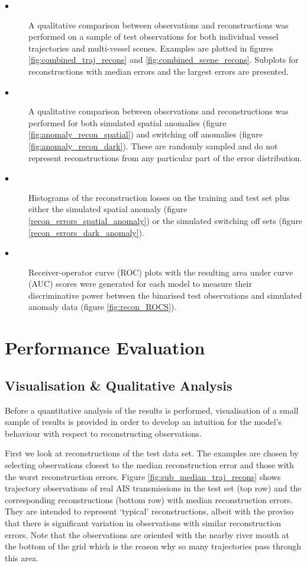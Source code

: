 \documentclass{mldsmsc}
\begin{document}
\begin{description}
	\item [$\bullet$]  A qualitative comparison between observations and reconstructions was performed on a sample of test observations for both individual vessel trajectories and multi-vessel scenes. Examples are plotted in figures \ref{fig:combined_traj_recons} and \ref{fig:combined_scene_recons}. Subplots for reconstructions with median errors and the largest errors are presented. 
	\item [$\bullet$]  A qualitative comparison between observations and reconstructions was performed for both simulated spatial anomalies (figure \ref{fig:anomaly_recon_spatial}) and switching off anomalies (figure \ref{fig:anomaly_recon_dark}). These are randomly sampled and do not represent reconstructions from any particular part of the error distribution.
	\item [$\bullet$] Histograms of the reconstruction losses on the training and test set plus either the simulated spatial anomaly (figure \ref{recon_errors_spatial_anomaly})  or the simulated switching off sets (figure \ref{recon_errors_dark_anomaly}). 
	\item [$\bullet$] Receiver-operator curve (ROC) plots with the resulting area under curve (AUC) scores were generated for each model to measure their discriminative power between the binarised test observations and simulated anomaly data (figure \ref{fig:recon_ROCS}). 
\end{description}

\section{Performance Evaluation}
\subsection{Visualisation \& Qualitative Analysis}\label{vis_and_QA}

Before a quantitative analysis of the results is performed, visualisation of a small sample of results is provided in order to develop an intuition for the model's behaviour with respect to reconstructing observations. 

First we look at reconstructions of the test data set. The examples are chosen by selecting observations closest to the median reconstruction error and those with the worst reconstruction errors. Figure \ref{fig:sub_median_traj_recons} shows  trajectory observations of real AIS transmissions in the test set (top row) and the corresponding reconstructions (bottom row) with median reconstruction errors. They are intended to represent `typical' reconstructions, albeit with the proviso that there is significant variation in observations with similar reconstruction errors. Note that the observations are oriented with the nearby river mouth at the bottom of the grid which is the reason why so many trajectories pass through this area.
\end{document}
